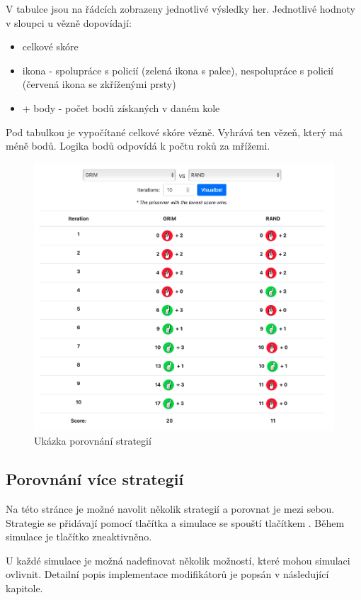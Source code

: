 \documentclass[12pt, a4paper]{article}
\begin{document}
\noindent V tabulce jsou na řádcích zobrazeny jednotlivé výsledky her. Jednotlivé hodnoty v sloupci u vězně dopovídají:
\begin{itemize}
  \item celkové skóre
  \item ikona - spolupráce s policií (zelená ikona s palce), nespolupráce s policií (červená ikona se zkříženými prsty)
  \item + body - počet bodů získaných v daném kole
\end{itemize}

Pod tabulkou je vypočítané celkové skóre vězně. Vyhrává ten vězeň, který má méně bodů. Logika bodů odpovídá k počtu roků za mřížemi.


\begin{figure}[!h]
  \centering
  \includegraphics[scale=0.25]{img/basic.png}
  \caption{Ukázka porovnání strategií}
\end{figure}
\newpage


\subsection{Porovnání více strategií}
\noindent Na této stránce je možné navolit několik strategií a porovnat je mezi sebou. Strategie se přidávají pomocí tlačítka \uv{+} a simulace se spouští tlačítkem . Během simulace je tlačítko zneaktivněno.

U každé simulace je možná nadefinovat několik možností, které mohou simulaci ovlivnit. Detailní popis implementace modifikátorů je popsán v následující kapitole.
\end{document}
